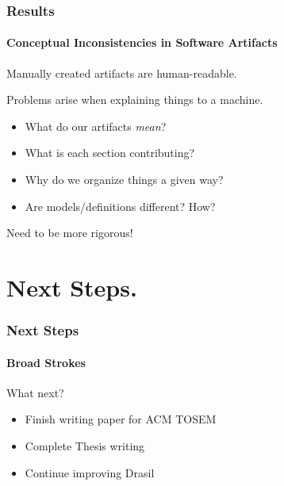 \documentclass{beamer}
\begin{document}

\begin{frame}

\frametitle{Results} %
\framesubtitle{Conceptual Inconsistencies in Software Artifacts}

Manually created artifacts are human-readable.

Problems arise when explaining things to a machine.

\begin{itemize}
\item What do our artifacts \emph{mean}?
\item What is each section contributing? %
\item Why do we organize things a given way?
\item Are models/definitions different? How?
\end{itemize}

Need to be more rigorous!

\end{frame}


\section[Next Steps]{Next Steps.}


\begin{frame}

\frametitle{Next Steps}
\framesubtitle{Broad Strokes}


\begin{Large}
What next?
\end{Large}

\begin{itemize}
\item Finish writing paper for ACM TOSEM
\item Complete Thesis writing
\item Continue improving Drasil %
\end{itemize}
\end{frame}

\end{document}
